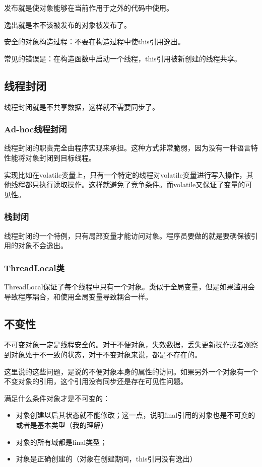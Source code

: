 发布就是使对象能够在当前作用于之外的代码中使用。

逸出就是本不该被发布的对象被发布了。

安全的对象构造过程：不要在构造过程中使this引用逸出。

常见的错误是：在构造函数中启动一个线程，this引用被新创建的线程共享。

\subsection{线程封闭}

线程封闭就是不共享数据，这样就不需要同步了。

\subsubsection{Ad-hoc线程封闭}

线程封闭的职责完全由程序实现来承担。这种方式非常脆弱，因为没有一种语言特性能将对象封闭到目标线程。

实现比如在volatile变量上，只有一个特定的线程对volatile变量进行写入操作，其他线程都只执行读取操作。这样就避免了竞争条件。而volatile又保证了变量的可见性。

\subsubsection{栈封闭}

线程封闭的一个特例，只有局部变量才能访问对象。程序员要做的就是要确保被引用的对象不会逸出。

\subsubsection{ThreadLocal类}

ThreadLocal保证了每个线程中只有一个对象。类似于全局变量，但是如果滥用会导致程序耦合，和使用全局变量导致耦合一样。


\subsection{不变性}

不可变对象一定是线程安全的。对于不便对象，失效数据，丢失更新操作或者观察到对象处于不一致的状态，对于不变对象来说，都是不存在的。

这里说的这些问题，是说的不便对象本身的属性的访问。如果另外一个对象有一个不变对象的引用，这个引用没有同步还是存在可见性问题。

满足什么条件对象才是不可变的：
\begin{itemize}
\item 对象创建以后其状态就不能修改；这一点，说明final引用的对象也是不可变的或者是基本类型（我的理解）
\item 对象的所有域都是final类型；
\item 对象是正确创建的（对象在创建期间，this引用没有逸出）
\end{itemize}



